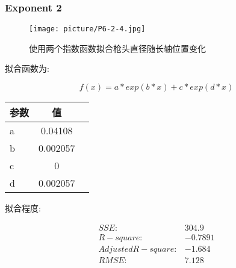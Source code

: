 \documentclass[UTF8]{ctexart}
\begin{document}
				\subsubsection{Exponent 2}
				\begin{figure}[h]
					\texttt{[image: picture/P6-2-4.jpg]}
					\caption{使用两个指数函数拟合枪头直径随长轴位置变化}
				\end{figure}
				\begin{flushleft}
					拟合函数为:
				\end{flushleft}
				\begin{center}
					$$  f(x) = a*exp(b*x) + c*exp(d*x)$$		
					\begin{tabular}{|l|c|c|}
						\hline
						参数&值\\
						\hline
						a &     0.04108\\
						\hline
						b &    0.002057\\
						\hline
						c &           0\\
						\hline
						d &    0.002057\\
						\hline								
					\end{tabular}
				\end{center}
				\begin{flushleft}
					拟合程度:
				\end{flushleft}
				\begin{center}
					$$
					\begin{matrix}
					SSE:& 304.9\\
					R-square:&-0.7891\\
					Adjusted R-square:&-1.684\\
					RMSE:&7.128\\
					\end{matrix}
					$$
				\end{center}
\end{document}
